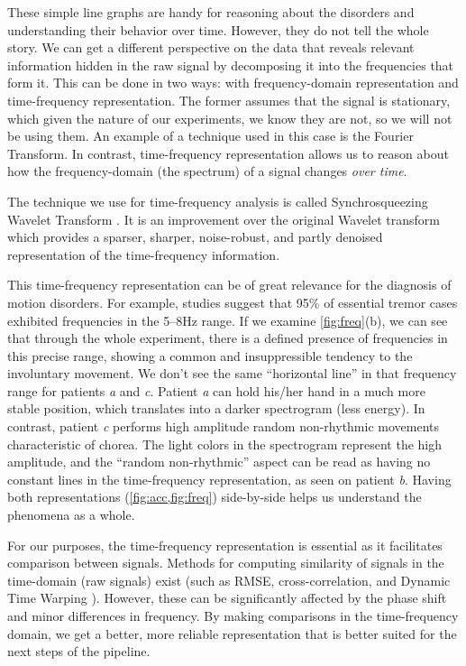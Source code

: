 These simple line graphs are handy for reasoning about the disorders and understanding their behavior over time. However, they do not tell the whole story. We can get a different perspective on the data that reveals relevant information hidden in the raw signal by decomposing it into the frequencies that form it. This can be done in two ways: with frequency-domain representation and time-frequency representation. The former assumes that the signal is stationary, which given the nature of our experiments, we know they are not, so we will not be using them. An example of a technique used in this case is the Fourier Transform. In contrast, time-frequency representation allows us to reason about how the frequency-domain (the spectrum) of a signal changes \textit{over time}.

The technique we use for time-frequency analysis is called Synchrosqueezing Wavelet Transform . It is an improvement over the original Wavelet transform  which provides a sparser, sharper, noise-robust, and partly denoised representation of the time-frequency information. 

This time-frequency representation can be of great relevance for the diagnosis of motion disorders. For example, studies suggest that 95\% of essential tremor cases exhibited frequencies in the 5--8Hz range. If we examine \cref{fig:freq}(b), we can see that through the whole experiment, there is a defined presence of frequencies in this precise range, showing a common and insuppressible tendency to the involuntary movement. We don't see the same ``horizontal line'' in that frequency range for patients \textit{a} and \textit{c}. Patient \textit{a} can hold his/her hand in a much more stable position, which translates into a darker spectrogram (less energy). In contrast, patient \textit{c} performs high amplitude random non-rhythmic movements characteristic of chorea. The light colors in the spectrogram represent the high amplitude, and the ``random non-rhythmic'' aspect can be read as having no constant lines in the time-frequency representation, as seen on patient \textit{b}. Having both representations (\cref{fig:acc,fig:freq}) side-by-side helps us understand the phenomena as a whole. 

For our purposes, the time-frequency representation is essential as it facilitates comparison between signals. Methods for computing similarity of signals in the time-domain (raw signals) exist (such as RMSE, cross-correlation, and Dynamic Time Warping ). However, these can be significantly affected by the phase shift and minor differences in frequency. By making comparisons in the time-frequency domain, we get a better, more reliable representation that is better suited for the next steps of the pipeline.

